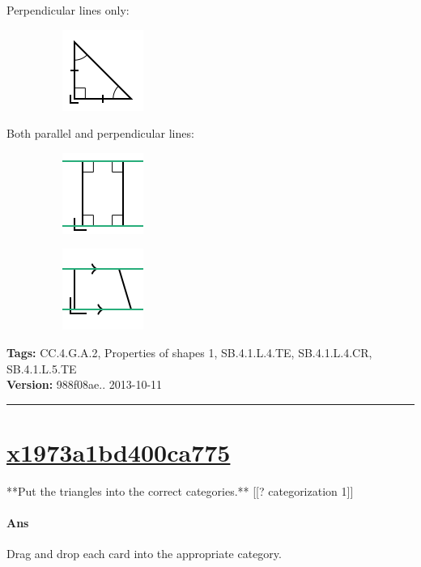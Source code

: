 \documentclass[twocolumn,10pt]{article}
\def\shrinkfactor{0.55}
\begin{document}
Perpendicular lines only:

$\phantom{xxxxxxxx}$
\includegraphics[scale=\shrinkfactor]{figures/f9413d967bb68c6b85d95672324c0a5b08af982e.png}

Both parallel and perpendicular lines:

$\phantom{xxxxxxxx}$
\includegraphics[scale=\shrinkfactor]{figures/ad42bf00e54b665d02d6e9aa787d9d04875ccc6e.png}

$\phantom{xxxxxxxx}$
\includegraphics[scale=\shrinkfactor]{figures/c755ceca3f49cc6303844bb5cd33f40647ddfab0.png}



\medskip
\noindent
\textbf{Tags:} {\footnotesize CC.4.G.A.2, Properties of shapes 1, SB.4.1.L.4.TE, SB.4.1.L.4.CR, SB.4.1.L.5.TE}\\
\textbf{Version:} 988f08ae.. 2013-10-11
\smallskip\hrule





\section{\href{https://www.khanacademy.org/devadmin/content/items/x1973a1bd400ca775}{x1973a1bd400ca775}}

\noindent
**Put the triangles into the correct categories.**
[[? categorization 1]]


\paragraph{Ans} Drag and drop each card into the appropriate category. 
\end{document}

